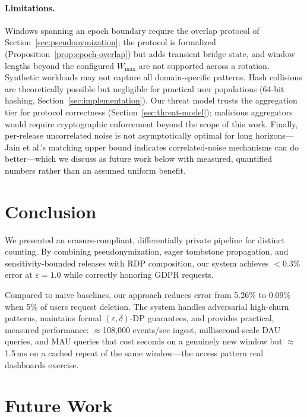 \documentclass[sigconf,anonymous,review]{acmart}
\begin{document}
\paragraph{Limitations.} Windows spanning an epoch boundary require the overlap protocol of Section~\ref{sec:pseudonymization}; the protocol is formalized (Proposition~\ref{prop:epoch-overlap}) but adds transient bridge state, and window lengths beyond the configured $W_{\max}$ are not supported across a rotation. Synthetic workloads may not capture all domain-specific patterns. Hash collisions are theoretically possible but negligible for practical user populations (64-bit hashing, Section~\ref{sec:implementation}). Our threat model trusts the aggregation tier for protocol correctness (Section~\ref{sec:threat-model}); malicious aggregators would require cryptographic enforcement beyond the scope of this work. Finally, per-release uncorrelated noise is not asymptotically optimal for long horizons---Jain et al.'s matching upper bound indicates correlated-noise mechanisms can do better---which we discuss as future work below with measured, quantified numbers rather than an assumed uniform benefit.

\section{Conclusion}

We presented an erasure-compliant, differentially private pipeline for distinct counting. By combining pseudonymization, eager tombstone propagation, and sensitivity-bounded releases with RDP composition, our system achieves $<$0.3\% error at $\varepsilon = 1.0$ while correctly honoring GDPR requests.

Compared to naive baselines, our approach reduces error from 5.26\% to 0.09\% when 5\% of users request deletion. The system handles adversarial high-churn patterns, maintains formal $(\varepsilon, \delta)$-DP guarantees, and provides practical, measured performance: $\approx$108,000 events/sec ingest, millisecond-scale DAU queries, and MAU queries that cost seconds on a genuinely new window but $\approx$1.5\,ms on a cached repeat of the same window---the access pattern real dashboards exercise.

\section{Future Work}
\label{sec:future-work}
\end{document}
